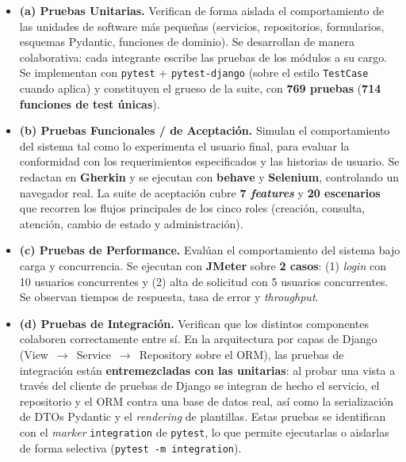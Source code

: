 \documentclass[12pt,letterpaper]{report}
\begin{document}
\begin{itemize}[leftmargin=*]
  \item \textbf{(a) Pruebas Unitarias.} Verifican de forma aislada el
  comportamiento de las unidades de software más pequeñas (servicios,
  repositorios, formularios, esquemas Pydantic, funciones de dominio). Se
  desarrollan de manera colaborativa: cada integrante escribe las pruebas de los
  módulos a su cargo. Se implementan con \texttt{pytest} + \texttt{pytest-django}
  (sobre el estilo \texttt{TestCase} cuando aplica) y constituyen el grueso de la
  suite, con \textbf{769 pruebas} (\textbf{714 funciones de test únicas}).

  \item \textbf{(b) Pruebas Funcionales / de Aceptación.} Simulan el
  comportamiento del sistema tal como lo experimenta el usuario final, para
  evaluar la conformidad con los requerimientos especificados y las historias de
  usuario. Se redactan en \textbf{Gherkin} y se ejecutan con \textbf{behave} y
  \textbf{Selenium}, controlando un navegador real. La suite de aceptación cubre
  \textbf{7 \emph{features}} y \textbf{20 escenarios} que recorren los flujos
  principales de los cinco roles (creación, consulta, atención, cambio de estado
  y administración).

  \item \textbf{(c) Pruebas de Performance.} Evalúan el comportamiento del
  sistema bajo carga y concurrencia. Se ejecutan con \textbf{JMeter} sobre
  \textbf{2 casos}: (1) \emph{login} con 10 usuarios concurrentes y (2) alta de
  solicitud con 5 usuarios concurrentes. Se observan tiempos de respuesta, tasa
  de error y \emph{throughput}.

  \item \textbf{(d) Pruebas de Integración.} Verifican que los distintos
  componentes colaboren correctamente entre sí. En la arquitectura por capas de
  Django (View~$\rightarrow$~Service~$\rightarrow$~Repository sobre el ORM), las
  pruebas de integración están \textbf{entremezcladas con las unitarias}: al
  probar una vista a través del cliente de pruebas de Django se integran de
  hecho el servicio, el repositorio y el ORM contra una base de datos real, así
  como la serialización de DTOs Pydantic y el \emph{rendering} de plantillas.
  Estas pruebas se identifican con el \emph{marker} \texttt{integration} de
  \texttt{pytest}, lo que permite ejecutarlas o aislarlas de forma selectiva
  (\texttt{pytest -m integration}).
\end{itemize}
\end{document}
